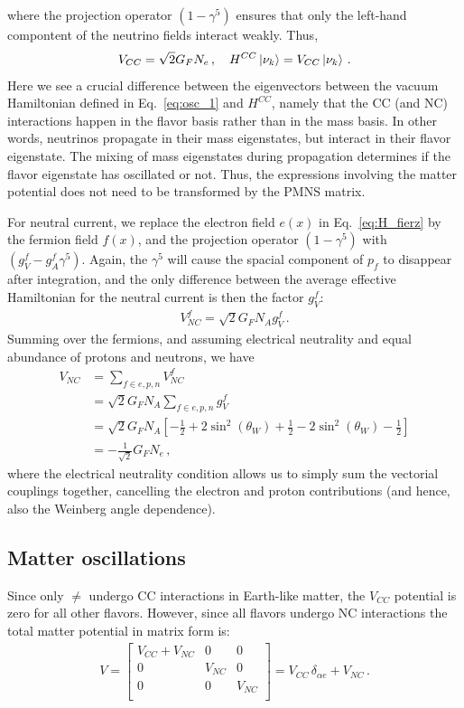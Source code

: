where the projection operator $(1- \gamma^5)$ ensures that only the left-hand compontent of the neutrino fields interact weakly. Thus,
\begin{align}\label{eq:V_CC1}
    V_{CC} = \sqrt{2}G_F N_e\,, \quad H^{CC}\ket{\nu_k} = V_{CC}\ket{\nu_k}\,.
\end{align}%
Here we see a crucial difference between the eigenvectors between the vacuum Hamiltonian defined in Eq.~\ref{eq:osc_1} and $H^{CC}$, namely
that the CC (and NC) interactions happen in the flavor basis rather than in the mass basis. In other words,
neutrinos propagate in their mass eigenstates, but interact in their flavor eigenstate. The mixing of mass eigenstates during propagation
determines if the flavor eigenstate has oscillated or not. Thus, the expressions involving the 
matter potential does not need to be transformed by the PMNS matrix.

For neutral current, we replace the electron field $e(x)$ in Eq.~\ref{eq:H_fierz} by the fermion field $f(x)$, and the projection operator 
$(1-\gamma^5)$ with $(g_V^f - g_A^f\gamma^5)$. Again, the $\gamma^5$ will cause the spacial component of $p_f$ to disappear after integration, and the 
only difference between the average effective Hamiltonian for the neutral current is then the factor $g_V^f$:
\begin{align}
    V^f_{NC} = \sqrt{2}G_F N_A g_V^f\,.
\end{align}
Summing over the fermions, and assuming electrical neutrality and equal abundance of protons and neutrons, we have
\begin{align}
    V_{NC} &= \sum_{f \in {e,p,n}} V^f_{NC} \nonumber \\
           &= \sqrt{2}G_F N_A \sum_{f \in {e,p,n}} g_V^f \nonumber \\
           &= \sqrt{2}G_F N_A\left[ -\frac{1}{2}+2\sin^2{(\theta_W)} + \frac{1}{2}-2\sin^2{(\theta_W)} -\frac{1}{2} \right] \nonumber \\
           &= -\frac{1}  {\sqrt{2}} G_F N_e\,,
\end{align}
where the electrical neutrality condition allows us to simply sum the vectorial couplings together, cancelling the electron and proton contributions (and hence, also the Weinberg angle dependence).

\subsection*{Matter oscillations}
Since only $\ne$ undergo CC interactions in Earth-like matter, the $V_{CC}$ potential is zero for all other flavors. However, since all flavors undergo NC interactions the total matter potential in matrix form is:
\begin{align}\label{eq:V_matrix}
    V = \begin{bmatrix}
        V_{CC} + V_{NC} & 0 & 0 \\
        0 & V_{NC} & 0 \\
        0 & 0 & V_{NC} \\
    \end{bmatrix} = V_{CC}\, \delta_{\alpha e} + V_{NC}\,.
\end{align}

